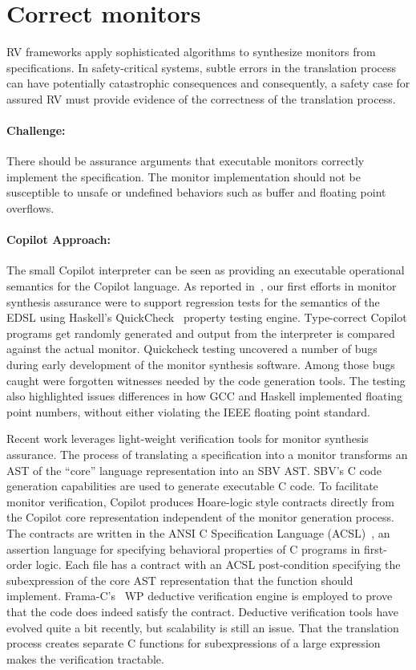 \section{Correct monitors} \label{sec:codecorrect} 
 RV frameworks apply sophisticated algorithms to synthesize  monitors
 from specifications. In safety-critical systems, subtle errors in the
 translation process can have potentially catastrophic
 consequences and consequently, a safety case for assured RV must
 provide evidence of the correctness of the translation process.



\paragraph{Challenge:} There should be assurance arguments that
executable monitors correctly implement the specification.  The monitor implementation
should not be susceptible to unsafe or undefined behaviors such as
buffer and floating point overflows. 

\paragraph{Copilot Approach:}    
The  small  Copilot interpreter can be seen as providing an executable
operational semantics for the Copilot language.  As reported
in~\cite{pike-icfp-12}, our first efforts in monitor
synthesis assurance were  to support  regression tests for the semantics
of the EDSL using Haskell's QuickCheck~\cite{qc} property testing
engine. Type-correct Copilot programs get randomly generated and
output from the interpreter is compared against the actual
monitor. Quickcheck testing uncovered 
a number of bugs during early development of the monitor synthesis
software. Among those bugs caught were forgotten witnesses needed by
the code generation tools. The testing also highlighted issues
differences in how GCC and Haskell implemented floating point numbers,
without either violating the IEEE floating point standard. 


Recent work  leverages light-weight verification tools for monitor
synthesis assurance.   The process of translating a specification into a monitor
transforms an AST of the ``core'' language representation into an SBV
AST.  SBV's C code generation capabilities are used to generate 
executable C code.  To facilitate monitor verification, Copilot 
produces Hoare-logic style contracts directly from the Copilot core
representation independent of the monitor generation process. The
contracts are written in the ANSI C Specification Language
(ACSL)~\cite{baudin09acsl}, an assertion language for specifying
behavioral properties of C programs in first-order logic.  Each file has a contract  with an ACSL 
post-condition  specifying the subexpression of the core
AST representation that the function should  implement. 
Frama-C's~\cite{framac} WP deductive verification engine is employed
to prove that the code does indeed satisfy the contract. Deductive
verification tools have evolved quite a bit recently, but scalability
is still an issue.  That the translation process creates separate C
functions for subexpressions of a large expression makes the
verification tractable. 


